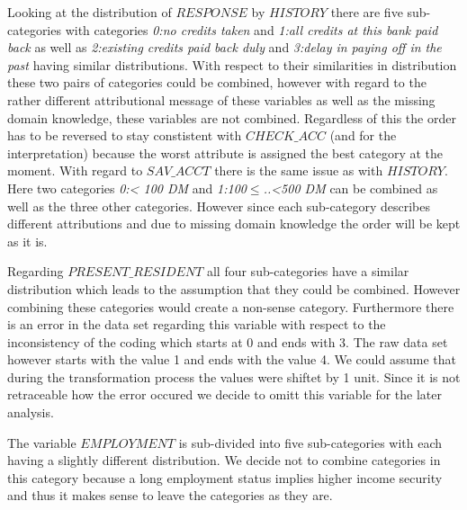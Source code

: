 Looking at the distribution of $RESPONSE$ by $HISTORY$ there are five sub-categories with categories \textit{0:no credits taken} and \textit{1:all credits at this bank paid back} as well as \textit{2:existing credits paid back duly} and \textit{3:delay in paying off in the past} having similar distributions. With respect to their similarities in distribution these two pairs of categories could be combined, however with regard to the rather different attributional message of these variables as well as the missing domain knowledge, these variables are not combined. Regardless of this the order has to be reversed to stay constistent with $CHECK\_ACC$ (and for the interpretation) because the worst attribute is assigned the best category at the moment. With regard to $SAV\_ACCT$ there is the same issue as with $HISTORY$. Here two categories \textit{0:< 100 DM} and \textit{1:100$\leq$..<500 DM} can be combined as well as the three other categories. However since each sub-category describes different attributions and due to missing domain knowledge the order will be kept as it is. 

Regarding $PRESENT\_RESIDENT$ all four sub-categories have a similar distribution which leads to the assumption that they could be combined. However combining these categories would create a non-sense category. Furthermore there is an error in the data set regarding this variable with respect to the inconsistency of the coding which starts at 0 and ends with 3. The raw data set however starts with the value 1 and ends with the value 4. We could assume that during the transformation process the values were shiftet by 1 unit. Since it is not retraceable how the error occured we decide to omitt this variable for the later analysis.

The variable $EMPLOYMENT$ is sub-divided into five sub-categories with each having a slightly different distribution. We decide not to combine categories in this category because a long employment status implies higher income security and thus it makes sense to leave the categories as they are.

